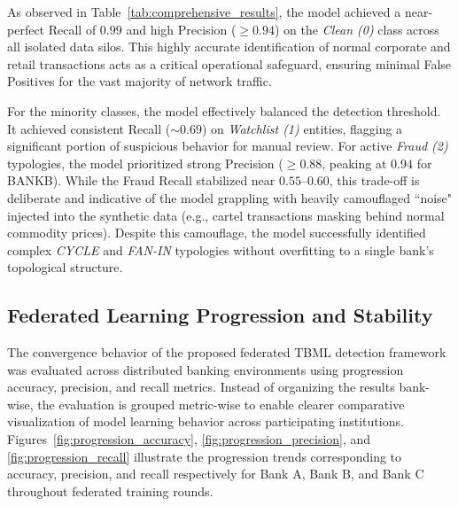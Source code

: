 \documentclass[conference]{IEEEtran}
\begin{document}
As observed in Table~\ref{tab:comprehensive_results}, the model achieved a near-perfect Recall of $0.99$ and high Precision ($\ge 0.94$) on the \textit{Clean (0)} class across all isolated data silos. This highly accurate identification of normal corporate and retail transactions acts as a critical operational safeguard, ensuring minimal False Positives for the vast majority of network traffic.

For the minority classes, the model effectively balanced the detection threshold. It achieved consistent Recall ($\sim 0.69$) on \textit{Watchlist (1)} entities, flagging a significant portion of suspicious behavior for manual review. For active \textit{Fraud (2)} typologies, the model prioritized strong Precision ($\ge 0.88$, peaking at $0.94$ for BANKB). While the Fraud Recall stabilized near $0.55$--$0.60$, this trade-off is deliberate and indicative of the model grappling with heavily camouflaged ``noise" injected into the synthetic data (e.g., cartel transactions masking behind normal commodity prices). Despite this camouflage, the model successfully identified complex \textit{CYCLE} and \textit{FAN-IN} typologies without overfitting to a single bank's topological structure.

\subsection{\textbf{Federated Learning Progression and Stability}}

The convergence behavior of the proposed federated TBML detection framework was evaluated across distributed banking environments using progression accuracy, precision, and recall metrics. Instead of organizing the results bank-wise, the evaluation is grouped metric-wise to enable clearer comparative visualization of model learning behavior across participating institutions. Figures~\ref{fig:progression_accuracy}, \ref{fig:progression_precision}, and \ref{fig:progression_recall} illustrate the progression trends corresponding to accuracy, precision, and recall respectively for Bank A, Bank B, and Bank C throughout federated training rounds.

\end{document}
